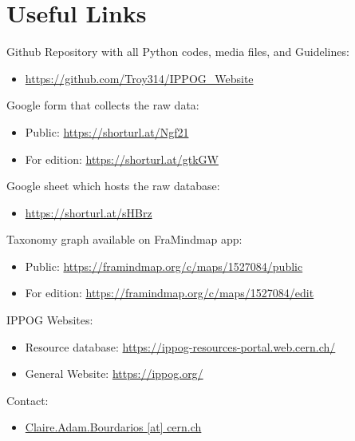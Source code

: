 \chapter{Useful Links}\label{chap:links}

Github Repository with all Python codes, media files, and Guidelines: 
\begin{itemize}
    \item \href{https://github.com/Troy314/IPPOG_Website}{https://github.com/Troy314/IPPOG\_Website}
\end{itemize}

\vspace{.1cm}

Google form that collects the raw data: 
\begin{itemize}
    \item Public: \href{https://docs.google.com/forms/d/e/1FAIpQLSckjdwv7daQZ8jv7D1wwx6mKeZo2Hp4hLGGmV8FT0VTthvOUg/viewform}{https://shorturl.at/Ngf21}
    \item For edition: \href{https://docs.google.com/forms/d/1DzX_IVaZAFX2ucAGyAKSgnYTvkAhOj0lDurSGn4De4E/edit?usp=send_form}{https://shorturl.at/gtkGW}
\end{itemize}

\vspace{.1cm}

Google sheet which hosts the raw database:
\begin{itemize}
    \item \href{https://docs.google.com/spreadsheets/d/1x_SdxdlHwG8chH77WqrTAAgijY2XBY3nPIi2p3TKqzs/edit?gid=1297224389#gid=1297224389}{https://shorturl.at/sHBrz}
\end{itemize}

\vspace{.1cm}

Taxonomy graph available on FraMindmap app:
\begin{itemize}
    \item Public: \href{https://framindmap.org/c/maps/1527084/public}{https://framindmap.org/c/maps/1527084/public}
    \item For edition: \href{https://framindmap.org/c/maps/1527084/edit}{https://framindmap.org/c/maps/1527084/edit}
\end{itemize}

\vspace{.1cm}

IPPOG Websites:
\begin{itemize}
    \item Resource database: \href{https://ippog-resources-portal.web.cern.ch/}{https://ippog-resources-portal.web.cern.ch/}
    \item General Website: \href{https://ippog.org/}{https://ippog.org/}
\end{itemize}

\vspace{.1cm}

Contact:
\begin{itemize}
    \item \href{mailto:Claire.Adam.Bourdarios@cern.ch}{Claire.Adam.Bourdarios [at] cern.ch}
\end{itemize}

